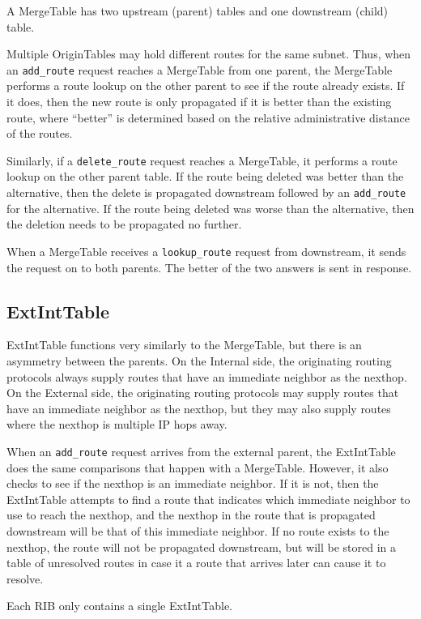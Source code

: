\documentclass[11pt]{article}
\begin{document}
A MergeTable has two upstream (parent) tables and one downstream
(child) table.

Multiple OriginTables may hold different routes for the same subnet.
Thus, when an {\tt add\_route} request reaches a MergeTable from one
parent, the MergeTable performs a route lookup on the other parent to
see if the route already exists.  If it does, then the new route is
only propagated if it is better than the existing route, where
``better'' is determined based on the relative administrative distance
of the routes.

Similarly, if a {\tt delete\_route} request reaches a MergeTable, it
performs a route lookup on the other parent table.  If the route being
deleted was better than the alternative, then the delete is propagated
downstream followed by an {\tt add\_route} for the alternative.  If the
route being deleted was worse than the alternative, then the deletion
needs to be propagated no further.

When a MergeTable receives a {\tt lookup\_route} request from
downstream, it sends the request on to both parents.  The better of
the two answers is sent in response.

\subsection{ExtIntTable}

ExtIntTable functions very similarly to the MergeTable, but there is
an asymmetry between the parents.  On the Internal side, the
originating routing protocols always supply routes that have an
immediate neighbor as the nexthop.  On the External side, the
originating routing protocols may supply routes that have an immediate
neighbor as the nexthop, but they may also supply routes where the
nexthop is multiple IP hops away.  

When an {\tt add\_route} request arrives from the external parent, the
ExtIntTable does the same comparisons that happen with a MergeTable.
However, it also checks to see if the nexthop is an immediate
neighbor.  If it is not, then the ExtIntTable attempts to find a route
that indicates which immediate neighbor to use to reach the nexthop,
and the nexthop in the route that is propagated downstream will be
that of this immediate neighbor.  If no route exists to the nexthop,
the route will not be propagated downstream, but will be stored in a
table of unresolved routes in case it a route that arrives later can
cause it to resolve.

Each RIB only contains a single ExtIntTable.
\end{document}

